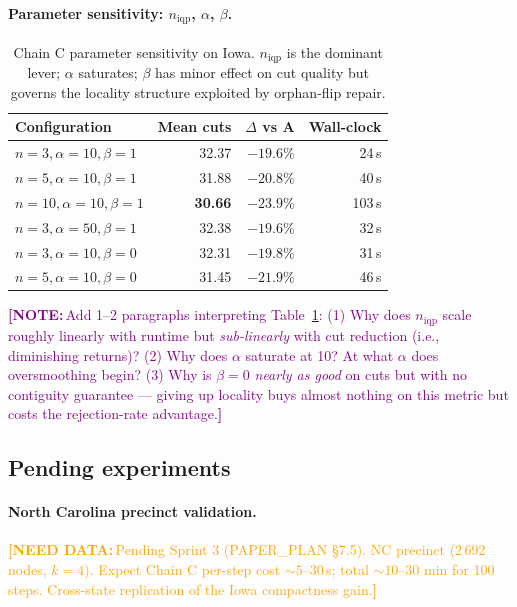 \documentclass[11pt]{article}
\newcommand{\needdata}[1]{\textcolor{orange}{\textbf{[NEED DATA:}\,#1\textbf{]}}}
\newcommand{\note}[1]{\textcolor{purple}{\textbf{[NOTE:}\,#1\textbf{]}}}
\begin{document}
\paragraph{Parameter sensitivity: $n_{\mathrm{iqp}}$, $\alpha$, $\beta$.}\label{sec:exp-sensitivity}

\begin{table}[H]
\centering
\small
\begin{tabular}{lrrr}
\toprule
Configuration & Mean cuts & $\Delta$ vs A & Wall-clock \\
\midrule
$n = 3, \alpha = 10, \beta = 1$  & 32.37 & $-19.6\%$ & 24\,s \\
$n = 5, \alpha = 10, \beta = 1$  & 31.88 & $-20.8\%$ & 40\,s \\
\textbf{$n = 10, \alpha = 10, \beta = 1$} & \textbf{30.66} & \textbf{$-23.9\%$} & 103\,s \\
$n = 3, \alpha = 50, \beta = 1$  & 32.38 & $-19.6\%$ & 32\,s \\
$n = 3, \alpha = 10, \beta = 0$  & 32.31 & $-19.8\%$ & 31\,s \\
$n = 5, \alpha = 10, \beta = 0$  & 31.45 & $-21.9\%$ & 46\,s \\
\bottomrule
\end{tabular}
\caption{Chain C parameter sensitivity on Iowa. $n_{\mathrm{iqp}}$ is
  the dominant lever; $\alpha$ saturates; $\beta$ has minor effect
  on cut quality but governs the locality structure exploited by
  orphan-flip repair.}\label{tab:sensitivity}
\end{table}

\note{Add 1--2 paragraphs interpreting Table~\ref{tab:sensitivity}:
(1) Why does $n_{\mathrm{iqp}}$ scale roughly linearly with runtime
but \emph{sub-linearly} with cut reduction (i.e., diminishing returns)?
(2) Why does $\alpha$ saturate at 10? At what $\alpha$ does
oversmoothing begin?
(3) Why is $\beta = 0$ \emph{nearly as good} on cuts but with no
contiguity guarantee --- giving up locality buys almost nothing on
this metric but costs the rejection-rate advantage.}

\subsection{Pending experiments}\label{sec:exp-pending}

\paragraph{North Carolina precinct validation.}\label{sec:exp-nc}
\needdata{Pending Sprint 3 (PAPER\_PLAN \S7.5). NC precinct (2\,692
nodes, $k = 4$). Expect Chain C per-step cost $\sim 5$--30\,s; total
$\sim 10$--30 min for 100 steps. Cross-state replication of the
Iowa compactness gain.}
\end{document}
